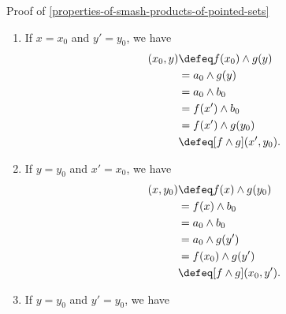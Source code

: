 \begin{Proof}{Proof of \cref{properties-of-smash-products-of-pointed-sets}}
\begin{enumerate}
            \begin{align*}
                [f\wedge g](x_{0},y) &\defeq f(x_{0})\wedge g(y)\\%
                                     &=      a_{0}\wedge g(y)\\%
                                     &=      a_{0}\wedge g(y')\\%
                                     &=      f(x_{0})\wedge g(y')\\%
                                     &\defeq [f\wedge g](x_{0},y').%
            \end{align*}
        \item\label{proof-of-properties-of-smash-products-of-pointed-sets-functoriality-5}If $x=x_{0}$ and $y'=y_{0}$, we have 
            \begin{align*}
                [f\wedge g](x_{0},y) &\defeq f(x_{0})\wedge g(y)\\%
                                     &=      a_{0}\wedge g(y)\\%
                                     &=      a_{0}\wedge b_{0}\\%
                                     &=      f(x')\wedge b_{0}\\%
                                     &=      f(x')\wedge g(y_{0})\\%
                                     &\defeq [f\wedge g](x',y_{0}).%
            \end{align*}
        \item\label{proof-of-properties-of-smash-products-of-pointed-sets-functoriality-6}If $y=y_{0}$ and $x'=x_{0}$, we have 
            \begin{align*}
                [f\wedge g](x,y_{0}) &\defeq f(x)\wedge g(y_{0})\\%
                                     &=      f(x)\wedge b_{0}\\%
                                     &=      a_{0}\wedge b_{0}\\%
                                     &=      a_{0}\wedge g(y')\\%
                                     &=      f(x_{0})\wedge g(y')\\%
                                     &\defeq [f\wedge g](x_{0},y').%
            \end{align*}
        \item\label{proof-of-properties-of-smash-products-of-pointed-sets-functoriality-7}If $y=y_{0}$ and $y'=y_{0}$, we have 

\end{enumerate}
\end{Proof}
